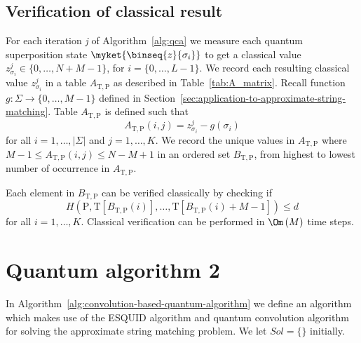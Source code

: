 \subsection{Verification of classical result}\label{subsec:verification-classical-result}
For each iteration \textit{j} of Algorithm~\ref{alg:qca} we measure each quantum superposition state $\myket{\binseq{z}{\sigma_i}}$ to get a classical value $z_{\sigma_{i}}^j \in \{0,\ldots,N+M-1\}$, for $i=\{0,\ldots,L-1\}$. We record each resulting classical value $z_{\sigma_{i}}^j$ in a table $A_{\mathrm{T},\mathrm{P}}$ as described in Table~\ref{tab:A_matrix}. Recall function $g:\Sigma \rightarrow \{0,\ldots,M-1\}$ defined in Section~\ref{sec:application-to-approximate-string-matching}. Table $A_{\mathrm{T},\mathrm{P}}$ is defined such that
\[
	A_{\mathrm{T},\mathrm{P}}(i,j) = z_{\sigma_{i}}^j - g(\sigma_i)
\]
for all $i=1,\ldots,\vert \Sigma \vert$ and $j=1,\ldots,K$. We record the unique values in $A_{\mathrm{T},\mathrm{P}}$ where $M-1 \leq A_{\mathrm{T},\mathrm{P}}(i,j) \leq N-M+1$ in an ordered set $B_{\mathrm{T},\mathrm{P}}$, from highest to lowest number of occurrence in $A_{\mathrm{T},\mathrm{P}}$.

Each element in $B_{\mathrm{T},\mathrm{P}}$ can be verified classically by checking if
\[
	H\left( \mathrm{P}, \mathrm{T}[B_{\mathrm{T},\mathrm{P}}(i)],\ldots,\mathrm{T}[B_{\mathrm{T},\mathrm{P}}(i) + M - 1] \right) \leq d
\]
for all $i=1,\ldots,K$. Classical verification can be performed in $\Om\left( M \right)$ time steps.

\section{Quantum algorithm 2}\label{sec:quantum-algorithm-2}
In Algorithm~\ref{alg:convolution-based-quantum-algorithm} we define an algorithm which makes use of the ESQUID algorithm and quantum convolution algorithm for solving the approximate string matching problem. We let $Sol = \{ \}$ initially.


